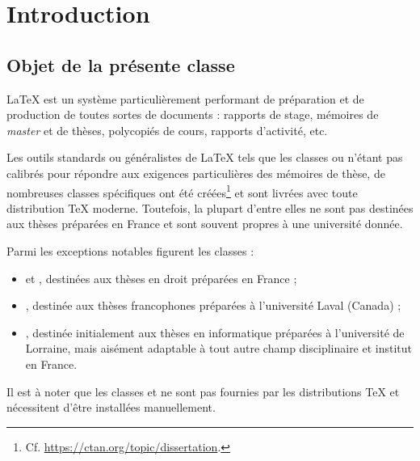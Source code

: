 \chapter{Introduction}

\section{Objet de la présente classe}
\label{sec-objet-de-la}

\LaTeX{} est un système particulièrement performant de préparation et de
production de toutes sortes de documents : rapports de stage, mémoires de
\emph{master} et de thèses, polycopiés de cours, rapports d'activité, etc.

Les outils standards ou généralistes de \LaTeX{} tels que les classes
 ou  n'étant pas calibrés pour répondre aux exigences
particulières des mémoires de thèse, de nombreuses classes spécifiques ont été
créées\footnote{Cf. \url{https://ctan.org/topic/dissertation}.}  et sont livrées
avec toute distribution \TeX{} moderne. Toutefois, la plupart d'entre elles ne
sont pas destinées aux thèses préparées en France et sont souvent propres à une
université donnée.

Parmi les exceptions notables figurent les classes :
\begin{itemize}
\item {} et
  , destinées aux
thèses en droit préparées en France ;
\item {}, destinée aux thèses francophones préparées à l'université
  Laval (Canada) ;
\item {}, destinée
  initialement aux thèses en informatique préparées à l'université de Lorraine,
  mais aisément adaptable à tout autre champ disciplinaire et institut en
  France.
\end{itemize}
Il est à noter que les classes  et  ne sont pas
fournies par les distributions \TeX{} et nécessitent d'être installées
manuellement.

\frenchabstract{}


